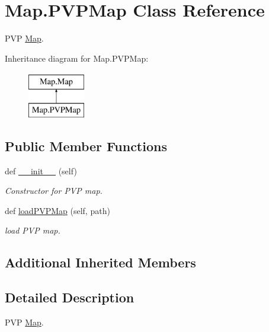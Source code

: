 \hypertarget{class_map_1_1_p_v_p_map}{}\section{Map.\+P\+V\+P\+Map Class Reference}
\label{class_map_1_1_p_v_p_map}


P\+VP \mbox{\hyperlink{class_map_1_1_map}{Map}}.  


Inheritance diagram for Map.\+P\+V\+P\+Map\+:\begin{figure}[H]
\begin{center}
\leavevmode
\includegraphics[height=2.000000cm]{class_map_1_1_p_v_p_map}
\end{center}
\end{figure}
\subsection*{Public Member Functions}
\begin{DoxyCompactItemize}
\item 
def \mbox{\hyperlink{class_map_1_1_p_v_p_map_a9d6a84ac6a94e5394a7157f885603a0c}{\+\_\+\+\_\+init\+\_\+\+\_\+}} (self)
\begin{DoxyCompactList}\small\item\em Constructor for P\+VP map. \end{DoxyCompactList}\item 
def \mbox{\hyperlink{class_map_1_1_p_v_p_map_a3a5bc78f48b960e2b9c57615587ae523}{load\+P\+V\+P\+Map}} (self, path)
\begin{DoxyCompactList}\small\item\em load P\+VP map. \end{DoxyCompactList}\end{DoxyCompactItemize}
\subsection*{Additional Inherited Members}


\subsection{Detailed Description}
P\+VP \mbox{\hyperlink{class_map_1_1_map}{Map}}. 

